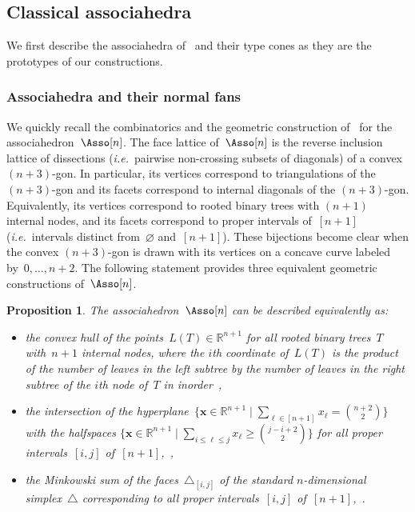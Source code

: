 \documentclass{amsart}
\newtheorem{proposition}[theorem]{Proposition}
\theoremstyle{definition}
\newcommand{\R}{\mathbb{R}} %
\renewcommand{\b}[1]{{\boldsymbol{#1}}} %
\newcommand{\bigset}[2]{\big\{ #1 \;\big|\; #2 \big\}} %
\newcommand{\simplex}{\triangle} %
\newcommand{\ie}{\textit{i.e.}~} %
\begin{document}

\subsection{Classical associahedra}

We first describe the associahedra of~\cite{ShniderSternberg, Loday} and their type cones as they are the prototypes of our constructions.

\subsubsection{Associahedra and their normal fans}

We quickly recall the combinatorics and the geometric construction of~\cite{ShniderSternberg, Loday} for the associahedron~$\Asso[n]$.
The face lattice of~$\Asso[n]$ is the reverse inclusion lattice of dissections (\ie pairwise non-crossing subsets of diagonals) of a convex~$(n+3)$-gon.
In particular, its vertices correspond to triangulations of the $(n+3)$-gon and its facets correspond to internal diagonals of the $(n+3)$-gon.
Equivalently, its vertices correspond to rooted binary trees with $(n+1)$ internal nodes, and its facets correspond to proper intervals of~$[n+1]$ (\ie intervals distinct from~$\varnothing$ and~$[n+1]$).
These bijections become clear when the convex $(n+3)$-gon is drawn with its vertices on a concave curve labeled by~$0, \dots, n+2$.
The following statement provides three equivalent geometric constructions of~$\Asso[n]$.

\begin{proposition}
\label{prop:associahedronLoday}
The associahedron~$\Asso[n]$ can be described equivalently as:
\begin{itemize}
\item the convex hull of the points~$L(T) \in \R^{n+1}$ for all rooted binary trees~$T$ with~$n+1$ internal nodes, where the $i$th coordinate of~$L(T)$ is the product of the number of leaves in the left subtree by the number of leaves in the right subtree of the $i$th node of~$T$ in inorder~\cite{Loday},
\item the intersection of the hyperplane~$\bigset{\b{x} \in \R^{n+1}}{\sum_{\ell \in [n+1]} x_\ell = \binom{n+2}{2}}$ with the halfspaces $\bigset{\b{x} \in \R^{n+1}}{\sum_{i \le \ell \le j} x_\ell \ge \binom{j-i+2}{2}}$ for all proper intervals~$[i,j]$ of~$[n+1]$,~\cite{ShniderSternberg},
\item the Minkowski sum of the faces~$\simplex_{[i,j]}$ of the standard $n$-dimensional simplex~$\simplex$ corresponding to all proper intervals~$[i,j]$ of~$[n+1]$,~\cite{Postnikov}.
\end{itemize}
\end{proposition}
\end{document}
